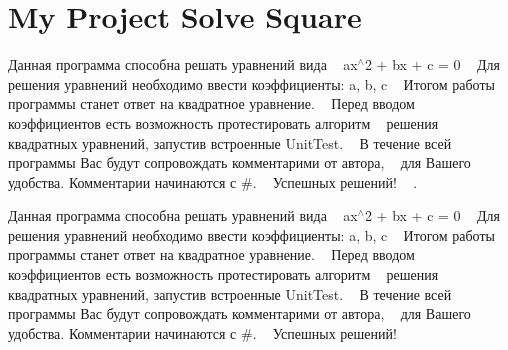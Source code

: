 \chapter{My Project Solve Square}
\hypertarget{index}{}\label{index}
Данная программа способна решать уравнений вида ~\newline
ax\texorpdfstring{$^\wedge$}{\string^}2 + bx + c = 0 ~\newline
Для решения уравнений необходимо ввести коэффициенты\+: a, b, c ~\newline
Итогом работы программы станет ответ на квадратное уравнение. ~\newline
Перед вводом коэффициентов есть возможность протестировать алгоритм ~\newline
решения квадратных уравнений, запустив встроенные Unit\+Test. ~\newline
В течение всей программы Вас будут сопровождать комментарими от автора, ~\newline
для Вашего удобства. Комментарии начинаются с \#. ~\newline
Успешных решений! ~\newline
.

Данная программа способна решать уравнений вида ~\newline
ax\texorpdfstring{$^\wedge$}{\string^}2 + bx + c = 0 ~\newline
Для решения уравнений необходимо ввести коэффициенты\+: a, b, c ~\newline
Итогом работы программы станет ответ на квадратное уравнение. ~\newline
Перед вводом коэффициентов есть возможность протестировать алгоритм ~\newline
решения квадратных уравнений, запустив встроенные Unit\+Test. ~\newline
В течение всей программы Вас будут сопровождать комментарими от автора, ~\newline
для Вашего удобства. Комментарии начинаются с \#. ~\newline
Успешных решений! ~\newline
  